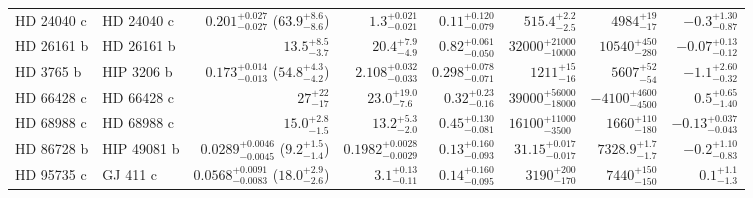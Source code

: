 \begin{longtable*}{llrrrrrr}
HD 24040 c & HD 24040 c & $0.201^{+0.027}_{-0.027}$ ($63.9^{+8.6}_{-8.6}$) & $1.3^{+0.021}_{-0.021}$ & $0.11^{+0.120}_{-0.079}$ & $515.4^{+2.2}_{-2.5}$ & $4984^{+19}_{-17}$ & $-0.3^{+1.30}_{-0.87}$ \\
HD 26161 b & HD 26161 b & $13.5^{+8.5}_{-3.7}$ & $20.4^{+7.9}_{-4.9}$ & $0.82^{+0.061}_{-0.050}$ & $32000^{+21000}_{-10000}$ & $10540^{+450}_{-280}$ & $-0.07^{+0.13}_{-0.12}$ \\
HD 3765 b & HIP 3206 b & $0.173^{+0.014}_{-0.013}$ ($54.8^{+4.3}_{-4.2}$) & $2.108^{+0.032}_{-0.033}$ & $0.298^{+0.078}_{-0.071}$ & $1211^{+15}_{-16}$ & $5607^{+52}_{-54}$ & $-1.1^{+2.60}_{-0.32}$ \\
HD 66428 c & HD 66428 c & $27^{+22}_{-17}$ & $23.0^{+19.0}_{-7.6}$ & $0.32^{+0.23}_{-0.16}$ & $39000^{+56000}_{-18000}$ & $-4100^{+4600}_{-4500}$ & $0.5^{+0.65}_{-1.40}$ \\
HD 68988 c & HD 68988 c & $15.0^{+2.8}_{-1.5}$ & $13.2^{+5.3}_{-2.0}$ & $0.45^{+0.130}_{-0.081}$ & $16100^{+11000}_{-3500}$ & $1660^{+110}_{-180}$ & $-0.13^{+0.037}_{-0.043}$ \\
HD 86728 b & HIP 49081 b & $0.0289^{+0.0046}_{-0.0045}$ ($9.2^{+1.5}_{-1.4}$) & $0.1982^{+0.0028}_{-0.0029}$ & $0.13^{+0.160}_{-0.093}$ & $31.15^{+0.017}_{-0.017}$ & $7328.9^{+1.7}_{-1.7}$ & $-0.2^{+1.10}_{-0.83}$ \\
HD 95735 c & GJ 411 c & $0.0568^{+0.0091}_{-0.0083}$ ($18.0^{+2.9}_{-2.6}$) & $3.1^{+0.13}_{-0.11}$ & $0.14^{+0.160}_{-0.095}$ & $3190^{+200}_{-170}$ & $7440^{+150}_{-150}$ & $0.1^{+1.1}_{-1.3}$ \\
\bottomrule
\end{longtable*}

